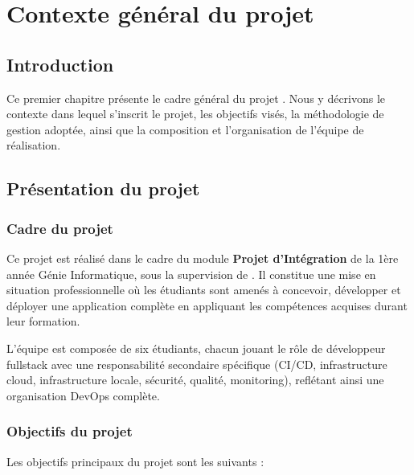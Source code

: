 \chapter{Contexte général du projet}
\label{chap:contexte}

\section{Introduction}
\label{sec:contexte:intro}

Ce premier chapitre présente le cadre général du projet \projectname{}. Nous y décrivons le contexte dans lequel s'inscrit le projet, les objectifs visés, la méthodologie de gestion adoptée, ainsi que la composition et l'organisation de l'équipe de réalisation.

\section{Présentation du projet}
\label{sec:contexte:presentation}

\subsection{Cadre du projet}
\label{subsec:contexte:cadre}

Ce projet est réalisé dans le cadre du module \textbf{Projet d'Intégration} de la 1ère année Génie Informatique, sous la supervision de \professeur. Il constitue une mise en situation professionnelle où les étudiants sont amenés à concevoir, développer et déployer une application complète en appliquant les compétences acquises durant leur formation.

L'équipe est composée de six étudiants, chacun jouant le rôle de développeur fullstack avec une responsabilité secondaire spécifique (CI/CD, infrastructure cloud, infrastructure locale, sécurité, qualité, monitoring), reflétant ainsi une organisation DevOps complète.

\subsection{Objectifs du projet}
\label{subsec:contexte:objectifs}

Les objectifs principaux du projet \projectname{} sont les suivants :

